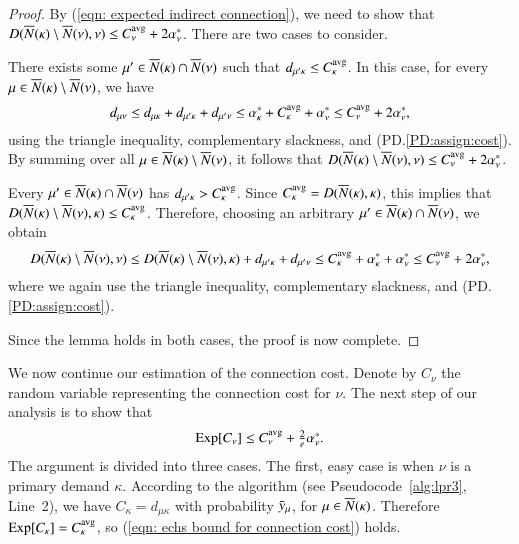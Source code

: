 \begin{proof}
By (\ref{eqn: expected indirect connection}), we need to show that $D({\overline{N}}(\kappa)
  \setminus {\overline{N}}(\nu), \nu) \leq C^{{\mbox{\scriptsize\rm avg}}}_\nu +
  2\alpha_{\nu}^\ast$. There are two cases to consider.

\begin{description}
%	
\item{}
	 There exists some $\mu'\in {\overline{N}}(\kappa) \cap
  {\overline{N}}(\nu)$ such that $d_{\mu' \kappa} \leq C^{{\mbox{\scriptsize\rm avg}}}_\kappa$.
In this case, for every $\mu\in {\overline{N}}(\kappa)\setminus {\overline{N}}(\nu)$, we have
%
\begin{equation*}
d_{\mu \nu} \leq d_{\mu \kappa} + d_{\mu' \kappa} + d_{\mu' \nu}  
 	\le  \alpha^\ast_\kappa + C^{{\mbox{\scriptsize\rm avg}}}_\kappa + \alpha^\ast_{\nu}
  \leq C^{{\mbox{\scriptsize\rm avg}}}_\nu + 2\alpha_{\nu}^\ast,
\end{equation*}
%
using the triangle inequality, complementary slackness, and (PD.\ref{PD:assign:cost}).
By summing over all $\mu\in {\overline{N}}(\kappa) \setminus {\overline{N}}(\nu)$, it
follows that $D({\overline{N}}(\kappa) \setminus {\overline{N}}(\nu), \nu) \leq
C^{{\mbox{\scriptsize\rm avg}}}_\nu + 2\alpha_{\nu}^\ast$.

\item{}
 Every $\mu'\in {\overline{N}}(\kappa)\cap {\overline{N}}(\nu)$
has $d_{\mu'\kappa} > C^{{\mbox{\scriptsize\rm avg}}}_\kappa$. Since $C^{{\mbox{\scriptsize\rm avg}}}_{\kappa} = D({\overline{N}}(\kappa),\kappa)$,
this implies that
$D({\overline{N}}(\kappa) \setminus {\overline{N}}(\nu),\kappa)\leq C^{{\mbox{\scriptsize\rm avg}}}_{\kappa}$. Therefore,
choosing an arbitrary $\mu'\in {\overline{N}}(\kappa)\cap {\overline{N}}(\nu)$,
we obtain
%
\begin{equation*}
  D({\overline{N}}(\kappa) \setminus {\overline{N}}(\nu), \nu) 
	\leq  D({\overline{N}}(\kappa) \setminus {\overline{N}}(\nu), \kappa) 
			+ d_{\mu' \kappa} + d_{\mu' \nu} 
	\leq  C^{{\mbox{\scriptsize\rm avg}}}_{\kappa} +
  \alpha_{\kappa}^\ast + \alpha_{\nu}^\ast
	\leq C^{{\mbox{\scriptsize\rm avg}}}_\nu + 2\alpha_{\nu}^\ast,
\end{equation*}
%
where we again use the triangle inequality,
complementary slackness, and  (PD.\ref{PD:assign:cost}).
%
\end{description}
%
Since the lemma holds in both cases, the proof is now complete.
\end{proof}

We now continue our estimation of the connection cost. Denote by $C_\nu$ the
random variable representing the connection cost for $\nu$. The next step
of our analysis is to show that 
%
\begin{equation}
	\textstyle
	\mbox{\rm Exp}[C_\nu]\le C^{{\mbox{\scriptsize\rm avg}}}_{\nu} + \frac{2}{e}\alpha^\ast_\nu.
	\label{eqn: echs bound for connection cost}
\end{equation}
%
The argument is divided into three cases. The first, easy case is when
$\nu$ is a primary demand $\kappa$. According to the algorithm
(see Pseudocode~\ref{alg:lpr3}, Line~2), we have $C_\kappa = d_{\mu\kappa}$ with probability ${\bar y}_{\mu}$, 
for $\mu\in {\overline{N}}(\kappa)$. Therefore $\mbox{\rm Exp}[C_\kappa] = C^{{\mbox{\scriptsize\rm avg}}}_{\kappa}$, so
(\ref{eqn: echs bound for connection cost}) holds.

